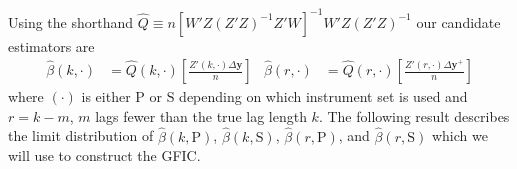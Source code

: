 Using the shorthand $\widehat{Q} \equiv n[W' Z(Z'Z)^{-1} Z'W]^{-1}W'Z(Z'Z)^{-1}$ our candidate estimators are
\begin{align}
  \widehat{\beta}(k,\cdot) &= \widehat{Q}(k,\cdot)\left[ \frac{Z'(k,\cdot)\Delta \mathbf{y}}{n} \right]& 
  \widehat{\beta}(r,\cdot) &= \widehat{Q}(r,\cdot)\left[ \frac{Z'(r,\cdot)\Delta \mathbf{y}^{+}}{n} \right]
  \label{eq:DpanelEstimators}
\end{align}
where $(\cdot)$ is either $\text{P}$ or $\text{S}$ depending on which instrument set is used and $r = k-m$, $m$ lags fewer than the true lag length $k$.
The following result describes the limit distribution of $\widehat{\beta}(k,\text{P})$, $\widehat{\beta}(k,\text{S})$, $\widehat{\beta}(r,\text{P})$, and $\widehat{\beta}(r,\text{S})$ which we will use to construct the GFIC.

